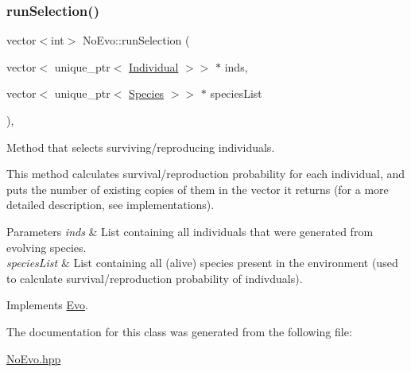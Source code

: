 \subsubsection{\texorpdfstring{run\+Selection()}{runSelection()}}
{\footnotesize\ttfamily vector$<$int$>$ No\+Evo\+::run\+Selection (\begin{DoxyParamCaption}\item[{vector$<$ unique\+\_\+ptr$<$ \hyperlink{classIndividual}{Individual} $>$$>$ $\ast$}]{inds,  }\item[{vector$<$ unique\+\_\+ptr$<$ \hyperlink{classSpecies}{Species} $>$$>$ $\ast$}]{species\+List }\end{DoxyParamCaption})\hspace{0.3cm}{\ttfamily [inline]}, {\ttfamily [virtual]}}



Method that selects surviving/reproducing individuals. 

This method calculates survival/reproduction probability for each individual, and puts the number of existing copies of them in the vector it returns (for a more detailed description, see implementations).


\begin{DoxyParams}{Parameters}
{\em inds} & List containing all individuals that were generated from evolving species. \\
\hline
{\em species\+List} & List containing all (alive) species present in the environment (used to calculate survival/reproduction probability of indivduals). \\
\hline
\end{DoxyParams}


Implements \hyperlink{classEvo_a10ff4eefe3967ff5cf5f820890c18079}{Evo}.



The documentation for this class was generated from the following file\+:\begin{DoxyCompactItemize}
\item 
\hyperlink{NoEvo_8hpp}{No\+Evo.\+hpp}\end{DoxyCompactItemize}
